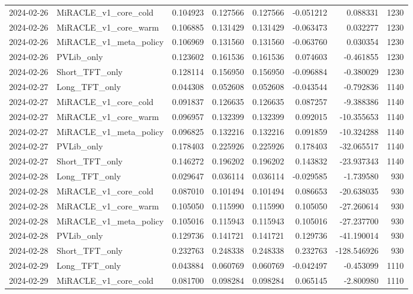 \begin{tabular}{llrrrrrr}
2024-02-26 & MiRACLE_v1_core_cold & 0.104923 & 0.127566 & 0.127566 & -0.051212 & 0.088331 & 1230 \\
2024-02-26 & MiRACLE_v1_core_warm & 0.106885 & 0.131429 & 0.131429 & -0.063473 & 0.032277 & 1230 \\
2024-02-26 & MiRACLE_v1_meta_policy & 0.106969 & 0.131560 & 0.131560 & -0.063760 & 0.030354 & 1230 \\
2024-02-26 & PVLib_only & 0.123602 & 0.161536 & 0.161536 & 0.074603 & -0.461855 & 1230 \\
2024-02-26 & Short_TFT_only & 0.128114 & 0.156950 & 0.156950 & -0.096884 & -0.380029 & 1230 \\
2024-02-27 & Long_TFT_only & 0.044308 & 0.052608 & 0.052608 & -0.043544 & -0.792836 & 1140 \\
2024-02-27 & MiRACLE_v1_core_cold & 0.091837 & 0.126635 & 0.126635 & 0.087257 & -9.388386 & 1140 \\
2024-02-27 & MiRACLE_v1_core_warm & 0.096957 & 0.132399 & 0.132399 & 0.092015 & -10.355653 & 1140 \\
2024-02-27 & MiRACLE_v1_meta_policy & 0.096825 & 0.132216 & 0.132216 & 0.091859 & -10.324288 & 1140 \\
2024-02-27 & PVLib_only & 0.178403 & 0.225926 & 0.225926 & 0.178403 & -32.065517 & 1140 \\
2024-02-27 & Short_TFT_only & 0.146272 & 0.196202 & 0.196202 & 0.143832 & -23.937343 & 1140 \\
2024-02-28 & Long_TFT_only & 0.029647 & 0.036114 & 0.036114 & -0.029585 & -1.739580 & 930 \\
2024-02-28 & MiRACLE_v1_core_cold & 0.087010 & 0.101494 & 0.101494 & 0.086653 & -20.638035 & 930 \\
2024-02-28 & MiRACLE_v1_core_warm & 0.105050 & 0.115990 & 0.115990 & 0.105050 & -27.260614 & 930 \\
2024-02-28 & MiRACLE_v1_meta_policy & 0.105016 & 0.115943 & 0.115943 & 0.105016 & -27.237700 & 930 \\
2024-02-28 & PVLib_only & 0.129736 & 0.141721 & 0.141721 & 0.129736 & -41.190014 & 930 \\
2024-02-28 & Short_TFT_only & 0.232763 & 0.248338 & 0.248338 & 0.232763 & -128.546926 & 930 \\
2024-02-29 & Long_TFT_only & 0.043884 & 0.060769 & 0.060769 & -0.042497 & -0.453099 & 1110 \\
2024-02-29 & MiRACLE_v1_core_cold & 0.081700 & 0.098284 & 0.098284 & 0.065145 & -2.800980 & 1110 \\

\end{tabular}
